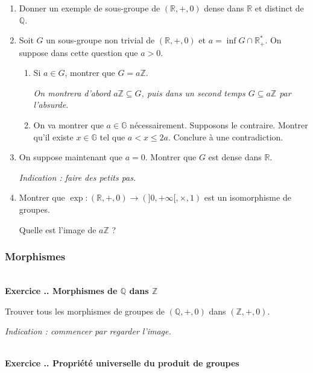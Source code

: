 \documentclass{article}
\newcommand{\mb}[1]{\mathbb{#1}}
\newcounter{exo}
\newcommand{\exercice}[1][\null]{\textbf{\\ Exercice \thesection.\theexo. #1} \addtocounter{exo}{1}}
\begin{document}
\begin{enumerate}

\item Donner un exemple de sous-groupe de $(\mb{R}, +, 0)$ dense dans $\mb{R}$ et distinct de $\mb{Q}$.

\item Soit $G$ un sous-groupe non trivial de $(\mb{R}, +, 0)$ et $a = \inf G \cap \mb{R}^*_+$. On suppose dans cette question que $a > 0$.

\begin{enumerate}

\item Si $a \in G$, montrer que $G = a \mb{Z}$.

\emph{On montrera d'abord $a\mb{Z} \subseteq G$, puis dans un second temps $G \subseteq a \mb{Z}$ par l'absurde.}

\item On va montrer que $a \in \mb{G}$ nécessairement. Supposons le contraire. Montrer qu'il existe $x \in \mb{G}$ tel que $a< x \le 2a$. Conclure à une contradiction.

\end{enumerate}

\item On suppose maintenant que $a = 0$. Montrer que $G$ est dense dans $\mb{R}$.

\emph{Indication : faire des petits pas.}

\item Montrer que $ \exp : (\mb{R}, +, 0) \rightarrow (]0, + \infty[, \times, 1)$ est un isomorphisme de groupes.

Quelle est l'image de $a \mb{Z}$ ?

\end{enumerate}

\subsubsection{Morphismes}

\exercice[Morphismes de $\mb{Q}$ dans $\mb{Z}$]

Trouver tous les morphismes de groupes de $(\mb{Q}, +, 0)$ dans $(\mb{Z}, +, 0)$.

\emph{Indication : commencer par regarder l'image.}

\exercice[Propriété universelle du produit de groupes]
\end{document}
